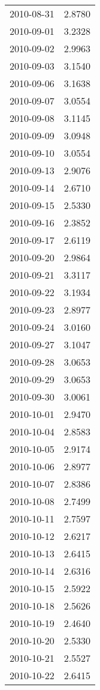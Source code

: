 \begin{tabular}{lr}
2010-08-31 &      2.8780 \\
2010-09-01 &      3.2328 \\
2010-09-02 &      2.9963 \\
2010-09-03 &      3.1540 \\
2010-09-06 &      3.1638 \\
2010-09-07 &      3.0554 \\
2010-09-08 &      3.1145 \\
2010-09-09 &      3.0948 \\
2010-09-10 &      3.0554 \\
2010-09-13 &      2.9076 \\
2010-09-14 &      2.6710 \\
2010-09-15 &      2.5330 \\
2010-09-16 &      2.3852 \\
2010-09-17 &      2.6119 \\
2010-09-20 &      2.9864 \\
2010-09-21 &      3.3117 \\
2010-09-22 &      3.1934 \\
2010-09-23 &      2.8977 \\
2010-09-24 &      3.0160 \\
2010-09-27 &      3.1047 \\
2010-09-28 &      3.0653 \\
2010-09-29 &      3.0653 \\
2010-09-30 &      3.0061 \\
2010-10-01 &      2.9470 \\
2010-10-04 &      2.8583 \\
2010-10-05 &      2.9174 \\
2010-10-06 &      2.8977 \\
2010-10-07 &      2.8386 \\
2010-10-08 &      2.7499 \\
2010-10-11 &      2.7597 \\
2010-10-12 &      2.6217 \\
2010-10-13 &      2.6415 \\
2010-10-14 &      2.6316 \\
2010-10-15 &      2.5922 \\
2010-10-18 &      2.5626 \\
2010-10-19 &      2.4640 \\
2010-10-20 &      2.5330 \\
2010-10-21 &      2.5527 \\
2010-10-22 &      2.6415 \\

\end{tabular}
